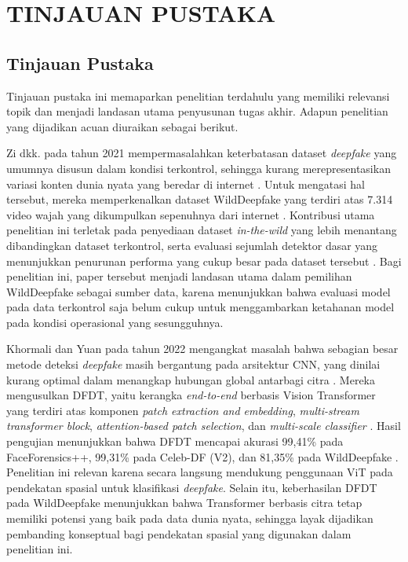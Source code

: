 \newpage
\chapter{TINJAUAN PUSTAKA} \label{Bab II}

\section{Tinjauan Pustaka} \label{II.Tinjauan}
Tinjauan pustaka ini memaparkan penelitian terdahulu yang memiliki relevansi topik dan menjadi landasan utama penyusunan tugas akhir. Adapun penelitian yang dijadikan acuan diuraikan sebagai berikut. \par

Zi dkk. pada tahun 2021 mempermasalahkan keterbatasan dataset \textit{deepfake} yang umumnya disusun dalam kondisi terkontrol, sehingga kurang merepresentasikan variasi konten dunia nyata yang beredar di internet \cite{Zi2024}. Untuk mengatasi hal tersebut, mereka memperkenalkan dataset WildDeepfake yang terdiri atas 7.314 video wajah yang dikumpulkan sepenuhnya dari internet \cite{Zi2024}. Kontribusi utama penelitian ini terletak pada penyediaan dataset \textit{in-the-wild} yang lebih menantang dibandingkan dataset terkontrol, serta evaluasi sejumlah detektor dasar yang menunjukkan penurunan performa yang cukup besar pada dataset tersebut \cite{Zi2024}. Bagi penelitian ini, paper tersebut menjadi landasan utama dalam pemilihan WildDeepfake sebagai sumber data, karena menunjukkan bahwa evaluasi model pada data terkontrol saja belum cukup untuk menggambarkan ketahanan model pada kondisi operasional yang sesungguhnya. \par

Khormali dan Yuan pada tahun 2022 mengangkat masalah bahwa sebagian besar metode deteksi \textit{deepfake} masih bergantung pada arsitektur CNN, yang dinilai kurang optimal dalam menangkap hubungan global antarbagi citra \cite{app12062953}. Mereka mengusulkan DFDT, yaitu kerangka \textit{end-to-end} berbasis Vision Transformer yang terdiri atas komponen \textit{patch extraction and embedding}, \textit{multi-stream transformer block}, \textit{attention-based patch selection}, dan \textit{multi-scale classifier} \cite{app12062953}. Hasil pengujian menunjukkan bahwa DFDT mencapai akurasi 99,41\% pada FaceForensics++, 99,31\% pada Celeb-DF (V2), dan 81,35\% pada WildDeepfake \cite{app12062953}. Penelitian ini relevan karena secara langsung mendukung penggunaan ViT pada pendekatan spasial untuk klasifikasi \textit{deepfake}. Selain itu, keberhasilan DFDT pada WildDeepfake menunjukkan bahwa Transformer berbasis citra tetap memiliki potensi yang baik pada data dunia nyata, sehingga layak dijadikan pembanding konseptual bagi pendekatan spasial yang digunakan dalam penelitian ini. \par

